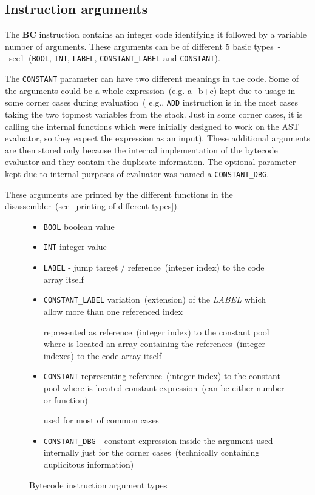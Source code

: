 \documentclass[thesis=M,english]{FITthesis}[2018/10/20]
\newcommand{\code}[1]{\texttt{#1}}
\begin{document}

\subsection{Instruction arguments}\label{instruction-arguments}
The \textbf{BC} instruction contains an integer code identifying it followed by a variable number of arguments. These arguments can be of different 5 basic types~-~see\ref{fig:bytecode-argument-types}~(\code{BOOL}, \code{INT}, \code{LABEL}, \code{CONSTANT{\_}LABEL} and \code{CONSTANT}).

The \code{CONSTANT} parameter can have two different meanings in the code. Some of the arguments could be a whole expression~(e.g. a+b+c) kept due to usage in some corner cases during evaluation~( e.g., \code{ADD} instruction is in the most cases taking the two topmost variables from the stack. Just in some corner cases, it is calling the internal functions which were initially designed to work on the AST evaluator, so they expect the expression as an input). These additional arguments are then stored only because the internal implementation of the bytecode evaluator and they contain the duplicate information. The optional parameter kept due to internal purposes of evaluator was named a \code{CONSTANT{\_}DBG}.

These arguments are printed by the different functions in the disassembler~(see~\ref{printing-of-different-types}).

\begin{figure}[H]
\begin{itemize}
	\item \code{BOOL} boolean value

	\item \code{INT} integer value

	\item \code{LABEL} - jump target / reference~(integer index) to the code array itself

	\item \code{CONSTANT{\_}LABEL} variation~(extension) of the \textit{LABEL} which allow more than one referenced index

	represented as reference~(integer index) to the constant pool where is located an array containing the references~(integer indexes) to the code array itself

	\item \code{CONSTANT} representing reference~(integer index) to the constant pool where is located constant expression~(can be either number or function)

	used for most of common cases

	\item \code{CONSTANT{\_}DBG} - constant expression inside the argument used internally just for the corner cases~(technically containing duplicitous information)
\end{itemize}
	\caption{Bytecode instruction argument types}\label{fig:bytecode-argument-types}
\end{figure}
\end{document}
